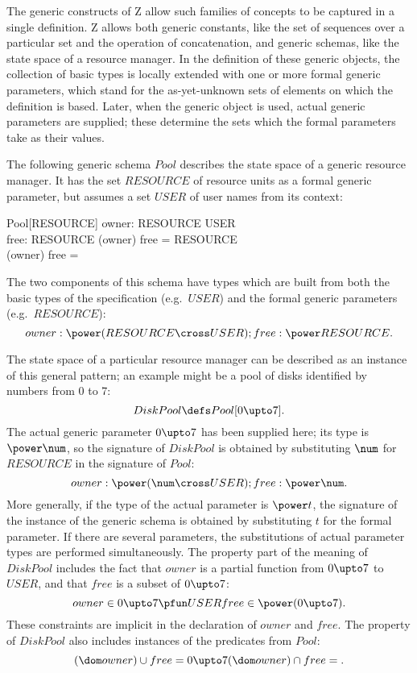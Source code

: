 The generic constructs of Z allow such
families of concepts to be captured in a single definition. Z allows
both generic constants, like the set of
sequences over a particular set and the operation of concatenation,
and generic schemas, like the state space of a
resource manager. In the definition of these generic objects, the
collection of basic types is locally extended with one or more
formal generic parameters, which stand for 
the as-yet-unknown sets of elements on which the definition is based.
Later, when the generic object is used, actual generic
parameters are supplied; these determine the sets which the formal
parameters take as their values.

The following generic schema $Pool$ describes the state space of a
generic resource manager.  It has the set
$RESOURCE$ of resource units as a formal generic parameter, but
assumes a set $USER$ of user names from its context:
\begin{schema}{Pool[RESOURCE]}
        owner: RESOURCE \pfun USER \\
        free: \power RESOURCE
\where
        (\dom owner) \cup free = RESOURCE \\
        (\dom owner) \cap free = \empty
\end{schema}
The two components of this schema have types which are built from both the
basic types of the specification (e.g.\ $USER$) and the formal
generic parameters (e.g.\ $RESOURCE$):
\[ owner: \power (RESOURCE \cross USER); free: \power RESOURCE. \]

The state space of a particular resource manager can be described as
an instance of this general pattern; an example might be a pool of
disks identified by numbers from 0 to 7:
\[ DiskPool \defs Pool[0 \upto 7]. \]
The actual generic parameter $0 \upto 7$ has been supplied here; its
type is $\power \num$, so the signature
of $DiskPool$ is obtained by substituting
$\num$ for $RESOURCE$ in the signature of $Pool$:
\[ owner: \power (\num \cross USER); free: \power \num. \]
More generally, if the type of the actual parameter is $\power t$,
the signature of the instance of the generic schema is obtained by
substituting $t$ for the formal parameter. If there are several
parameters, the substitutions of actual parameter types are
performed simultaneously.  The property part of the meaning of
$DiskPool$ includes the fact that $owner$ is a partial function from
$0 \upto 7$ to $USER$, and that $free$ is a subset of $0 \upto 7$:
\[ owner \in 0 \upto 7 \pfun USER \\
   free \in \power (0 \upto 7). \]
These constraints are implicit in the declaration of $owner$ and
$free$.  The property of $DiskPool$ also includes instances of the
predicates from $Pool$:
\[ (\dom owner) \cup free = 0 \upto 7 \\
   (\dom owner) \cap free = \empty. \]

